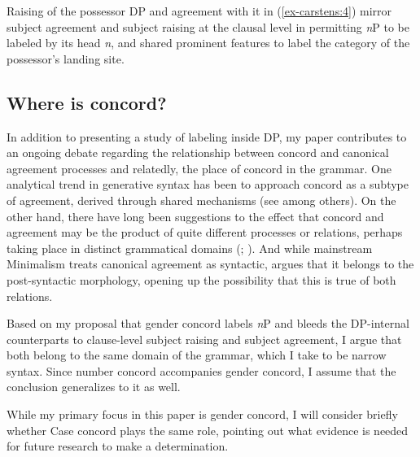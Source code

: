 \documentclass[output=paper
,modfonts
,nonflat]{langsci/langscibook}
\begin{document}
Raising of the possessor DP and agreement with it in (\ref{ex-carstens:4}) mirror subject agreement and subject raising at the clausal level in permitting \textit{n}P to be labeled by its head \textit{n}, and shared prominent features to label the category of the possessor's landing site. 

\subsection{Where is concord?} \label{sec-carstens:1.2}
In addition to presenting a study of labeling inside DP, my paper contributes to an ongoing debate regarding the relationship between concord and canonical agreement processes and relatedly, the place of concord in the grammar. One analytical trend in generative syntax has been to approach concord as a subtype of agreement, derived through shared mechanisms (see \citealt{Carstens1991,Carstens2000,Carstens2011,Koopman2006,Baker2008a,Danon2011,Toosarvandani_Van_Urk2014} among others). On the other hand, there have long been suggestions to the effect that concord and agreement may be the product of quite different processes or relations, perhaps taking place in distinct grammatical domains (\citealt[][fn 6]{Chomsky2001}; \citealt{Chung2013,Norris2014,Baier2015}). And while mainstream Minimalism treats canonical agreement as syntactic, \citet{Bobaljik2008} argues that it belongs to the post-syntactic morphology, opening up the possibility that this is true of both relations. 

Based on my proposal that gender concord labels \textit{n}P and bleeds the DP-internal counterparts to clause-level subject raising and subject agreement, I argue that both belong to the same domain of the grammar, which I take to be narrow syntax. Since number concord accompanies gender concord, I assume that the conclusion generalizes to it as well. 

While my primary focus in this paper is gender concord, I will consider briefly whether Case concord plays the same role, pointing out what evidence is needed for future research to make a determination.
\end{document}
